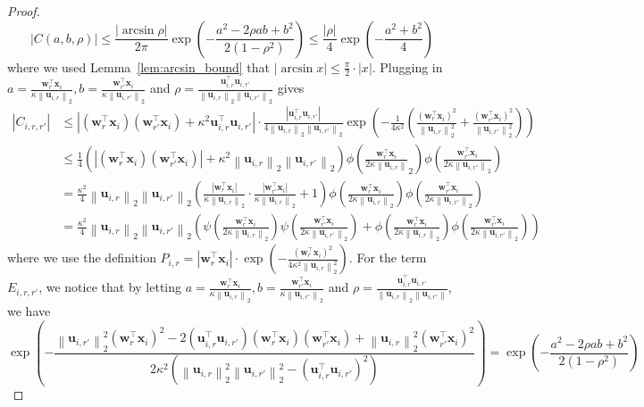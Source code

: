 \documentclass[10pt]{article} %
\theoremstyle{definition}
\theoremstyle{plain}
\newcommand{\paren}[1]{\left(#1\right)}
\newcommand{\norm}[1]{\left\|#1\right\|}
\def\bfu{{\mathbf{u}}}\def\bfv{{\mathbf{v}}}\def\bfw{{\mathbf{w}}}\def\bfx{{\mathbf{x}}}
\begin{document}
\begin{proof}
    \[
        \left|C\paren{a, b,\rho}\right| \leq \frac{\left|\arcsin \rho\right|}{2\pi}\exp\paren{-\frac{a^2-2\rho ab + b^2}{2\paren{1-\rho^2}}} \leq \frac{|\rho|}{4}\exp\paren{-\frac{a^2+b^2}{4}}
    \]
    where we used Lemma~\ref{lem:arcsin_bound} that $|\arcsin x|\leq \frac{\pi}{2}\cdot |x|$. Plugging in $a = \frac{\bfw_r^\top\bfx_i}{\kappa\norm{\bfu_{i,r}}_2}, b = \frac{\bfw_{r'}^\top\bfx_i}{\kappa\norm{\bfu_{i,r'}}_2}$ and $\rho = \frac{\bfu_{i,r}^\top\bfu_{i,r'}}{\norm{\bfu_{i,r}}_2\norm{\bfu_{i,r'}}_2}$ gives
    \begin{align*}
        \left|C_{i,r,r'}\right| & \leq \left|\paren{\bfw_r^\top\bfx_i}\paren{\bfw_{r'}^\top\bfx_i} + \kappa^2\bfu_{i,r}^\top\bfu_{i,r'}\right|\cdot\frac{\left|\bfu_{i,r}^\top\bfu_{i,r'}\right|}{4\norm{\bfu_{i,r}}_2\norm{\bfu_{i,r'}}_2}\exp\paren{-\frac{1}{4\kappa^2}\paren{\frac{\paren{\bfw_r^\top\bfx_i}^2}{\norm{\bfu_{i,r}}_2^2} + \frac{\paren{\bfw_{r'}^\top\bfx_i}^2}{\norm{\bfu_{i,r'}}_2^2}}}\\
        & \leq \frac{1}{4}\paren{\left|\paren{\bfw_r^\top\bfx_i}\paren{\bfw_{r'}^\top\bfx_i}\right| + \kappa^2\norm{\bfu_{i,r}}_2\norm{\bfu_{i,r'}}_2}\phi\paren{\frac{\bfw_r^\top\bfx_i}{2\kappa\norm{\bfu_{i,r}}}_2}\phi\paren{\frac{\bfw_{r'}^\top\bfx_i}{2\kappa\norm{\bfu_{i,r'}}_2}}\\
        & = \frac{\kappa^2}{4}\norm{\bfu_{i,r}}_2\norm{\bfu_{i,r'}}_2\paren{\frac{\left|\bfw_r^\top\bfx_i\right|}{\kappa\norm{\bfu_{i,r}}_2}\cdot\frac{\left|\bfw_{r'}^\top\bfx_i\right|}{\kappa\norm{\bfu_{i,r}}_2} + 1}\phi\paren{\frac{\bfw_r^\top\bfx_i}{2\kappa\norm{\bfu_{i,r}}_2}}\phi\paren{\frac{\bfw_{r'}^\top\bfx_i}{2\kappa\norm{\bfu_{i,r'}}_2}}\\
        & = \frac{\kappa^2}{4}\norm{\bfu_{i,r}}_2\norm{\bfu_{i,r'}}_2\paren{\psi\paren{\frac{\bfw_r^\top\bfx_i}{2\kappa\norm{\bfu_{i,r}}_2}}\psi\paren{\frac{\bfw_{r'}^\top\bfx_i}{2\kappa\norm{\bfu_{i,r'}}_2}} + \phi\paren{\frac{\bfw_r^\top\bfx_i}{2\kappa\norm{\bfu_{i,r}}_2}}\phi\paren{\frac{\bfw_{r'}^\top\bfx_i}{2\kappa\norm{\bfu_{i,r'}}_2}}}
    \end{align*}
    where we use the definition $P_{i,r} = \left|\bfw_r^\top\bfx_i\right|\cdot \exp\paren{-\frac{\paren{\bfw_r^\top\bfx_i}^2}{4\kappa^2\norm{\bfu_{i,r}}_2^2}}$.
    For the term $E_{i,r,r'}$, we notice that by letting $a = \frac{\bfw_r^\top\bfx_i}{\kappa\norm{\bfu_{i,r}}_2}, b = \frac{\bfw_{r'}^\top\bfx_i}{\kappa\norm{\bfu_{i,r'}}_2}$ and $\rho = \frac{\bfu_{i,r}^\top\bfu_{i,r'}}{\norm{\bfu_{i,r}}_2\norm{\bfu_{i,r'}}}$, we have
    \[
        \exp\paren{-\frac{\norm{\bfu_{i,r'}}_2^2\paren{\bfw_r^\top\bfx_i}^2-2\paren{\bfu_{i,r}^\top\bfu_{i,r'}}\paren{\bfw_r^\top\bfx_i}\paren{\bfw_{r'}^\top\bfx_i} + \norm{\bfu_{i,r}}_2^2\paren{\bfw_{r'}^\top\bfx_i}^2}{2\kappa^2\paren{\norm{\bfu_{i,r}}_2^2\norm{\bfu_{i,r'}}_2^2-\paren{\bfu_{i,r}^\top\bfu_{i,r'}}^2}}} = \exp\paren{-\frac{a^2- 2\rho ab + b^2}{2\paren{1-\rho^2}}}
\]
\end{proof}
\end{document}
